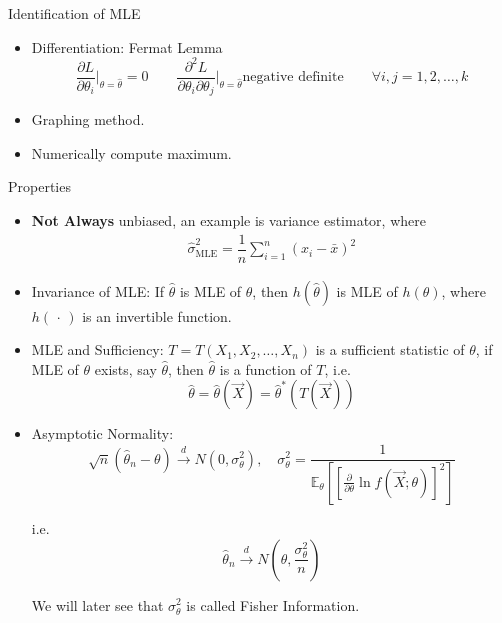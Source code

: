     \begin{point}
        Identification of MLE
    \end{point}
    
    \begin{itemize}[topsep=2pt,itemsep=0pt]
        \item Differentiation: Fermat Lemma
        \begin{equation}
            \frac{\partial L}{\partial \theta_i}\bigg|_{\theta=\hat{\theta}}=0\qquad \frac{\partial^2 L}{\partial \theta_i \partial \theta_j}\bigg|_{\theta=\hat{\theta}}\text{negative definite}\qquad \forall i,j=1,2,\ldots,k
        \end{equation}
        \item Graphing method.
        \item Numerically compute maximum.
    \end{itemize}

    \begin{point}
        Properties
    \end{point}
    
        
    \begin{itemize}
        \item \textbf{Not Always} unbiased, an example is variance estimator, where
        \begin{align*}
            \hat{\sigma }^2_\mathrm{MLE}=\dfrac{1}{n}\sum_{i=1}^n(x_i-\bar{x})^2  
        \end{align*}
        
         
        \item Invariance of MLE: If $\hat{\theta}$ is MLE of $\theta$,  then $h(\hat{\theta})$ is MLE of $h(\theta)$, where $ h(\, \cdot \, ) $ is an invertible function.
        \item MLE and Sufficiency: $T=T(X_1,X_2,\ldots,X_n)$ is a sufficient statistic of $\theta$, if MLE of $\theta$ exists, say $\hat{\theta}$, then $\hat{\theta}$ is a function of $T$, i.e.
        \begin{equation}  
            \hat{\theta}=\hat{\theta}(\vec{X})=\hat{\theta}^*(T(\vec{X}))    
        \end{equation}
        \item Asymptotic Normality: 
        \begin{equation}
            \sqrt{n}(\hat{\theta}_n-\theta) \xrightarrow[]{d}N(0,\sigma^2_\theta),\quad \sigma^2_\theta=\frac{1}{\mathbb{E}_\theta\left[[\frac{\partial}{\partial\theta}\ln f(\vec{X};\theta)]^2\right]}   
        \end{equation}

        i.e.
        \begin{equation}
            \hat{\theta}_n\xrightarrow[]{d}N(\theta,\frac{\sigma^2_\theta}{n})    
        \end{equation}
        
        We will later see that $ \sigma _\theta ^2 $ is called Fisher Information.
    \end{itemize}


